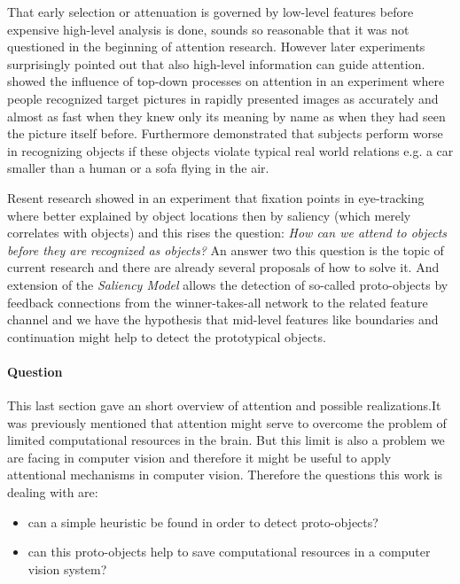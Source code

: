 That early selection or attenuation is governed by low-level features before expensive high-level analysis is done, sounds so reasonable that it was not questioned in the beginning of attention research. However later experiments surprisingly pointed out that also high-level information can guide attention. \cite{Potter:1975dr} showed the influence of top-down processes on attention in an experiment where people recognized target pictures in rapidly presented images as accurately and almost as fast when they knew only its meaning by name as when they had seen the picture itself before. Furthermore \cite{Biederman:1982um} demonstrated that subjects perform worse in recognizing objects if these objects violate typical real world relations e.g. a car smaller than a human or a sofa flying in the air.

Resent research \citep{Einhauser:2008cv} showed in an experiment that fixation points in eye-tracking where better explained by object locations then by saliency (which merely correlates with objects) and this rises the question: \emph{How can we attend to objects before they are recognized as objects?} An answer two this question is the topic of current research and there are already several proposals of how to solve it. And extension of the \emph{Saliency Model} \citep{Walther:2006tg} allows the detection of so-called proto-objects by feedback connections from the winner-takes-all network to the related feature channel and we have the hypothesis that mid-level features like boundaries and continuation might help to detect the prototypical objects.


\paragraph{Question} %
\label{par:question}
This last section gave an short overview of attention and possible realizations.It was previously mentioned that attention might serve to overcome the problem of limited computational resources in the brain. But this limit is also a problem we are facing in computer vision and therefore it might be useful to apply attentional mechanisms in computer vision. Therefore the questions this work is dealing with are:

\begin{itemize}
    \item can a simple heuristic be found in order to detect proto-objects?
    \item can this proto-objects help to save computational resources in a computer vision system?
\end{itemize}

